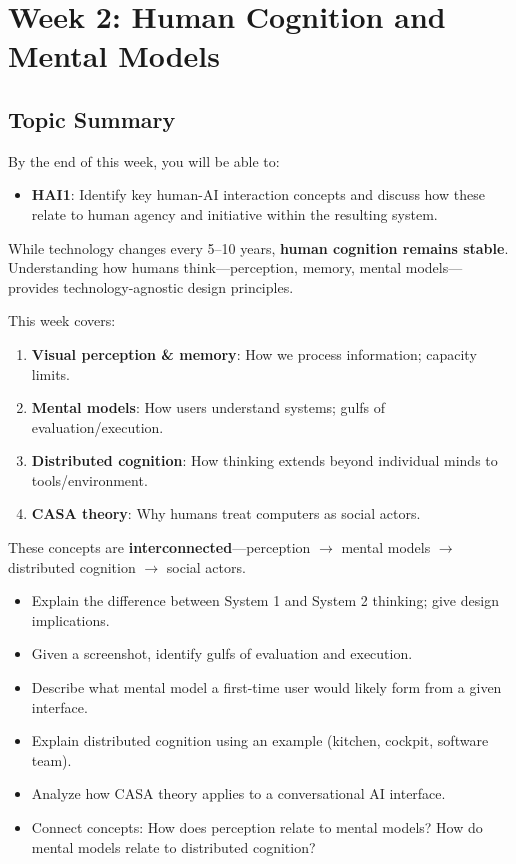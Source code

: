 \section{Week 2: Human Cognition and Mental Models}

\subsection{Topic Summary}

\begin{keybox}
By the end of this week, you will be able to:
\begin{itemize}
  \item \textbf{HAI1}: Identify key human-AI interaction concepts and discuss how these relate to human agency and initiative within the resulting system.
\end{itemize}
\end{keybox}

\begin{keybox}
While technology changes every 5--10 years, \textbf{human cognition remains stable}. Understanding how humans think---perception, memory, mental models---provides technology-agnostic design principles.

This week covers:
\begin{enumerate}
  \item \textbf{Visual perception \& memory}: How we process information; capacity limits.
  \item \textbf{Mental models}: How users understand systems; gulfs of evaluation/execution.
  \item \textbf{Distributed cognition}: How thinking extends beyond individual minds to tools/environment.
  \item \textbf{CASA theory}: Why humans treat computers as social actors.
\end{enumerate}
These concepts are \textbf{interconnected}---perception $\to$ mental models $\to$ distributed cognition $\to$ social actors.
\end{keybox}

\begin{keybox}
\begin{itemize}
  \item Explain the difference between System 1 and System 2 thinking; give design implications.
  \item Given a screenshot, identify gulfs of evaluation and execution.
  \item Describe what mental model a first-time user would likely form from a given interface.
  \item Explain distributed cognition using an example (kitchen, cockpit, software team).
  \item Analyze how CASA theory applies to a conversational AI interface.
  \item Connect concepts: How does perception relate to mental models? How do mental models relate to distributed cognition?
\end{itemize}
\end{keybox}

